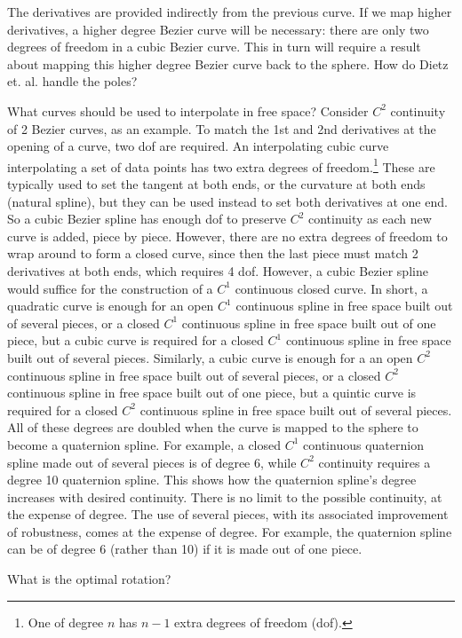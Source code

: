 \documentclass[12pt]{article}
\begin{document}
The derivatives are provided indirectly from the previous curve.
If we map higher derivatives, a higher degree Bezier curve will be necessary:
there are only two degrees of freedom in a cubic Bezier curve.
This in turn will require a result about mapping this higher degree Bezier curve
back to the sphere.
How do Dietz et. al. handle the poles?

What curves should be used to interpolate in free space?
Consider $C^2$ continuity of 2 Bezier curves, as an example.
To match the 1st and 2nd derivatives at the opening of a curve, two dof are required.
An interpolating cubic curve interpolating a set of data points has two extra degrees of freedom.\footnote{One of degree $n$ has $n-1$ extra degrees of freedom (dof).}
These are typically used to set the tangent at both ends, or the curvature at both ends
(natural spline), but they can be used instead to set both derivatives at one end.
So a cubic Bezier spline has enough dof to preserve $C^2$ continuity 
as each new curve is added, piece by piece.
However, there are no extra degrees of freedom to wrap around to form a closed curve,
since then the last piece must match 2 derivatives at both ends,
which requires 4 dof.
However, a cubic Bezier spline would suffice for the construction
of a $C^1$ continuous closed curve.
In short, a quadratic curve is enough for an open $C^1$ continuous spline in free space
built out of several pieces, or a closed $C^1$ continuous spline in free space
built out of one piece, but a cubic curve is required for a closed $C^1$ continuous spline
in free space built out of several pieces.
Similarly, a cubic curve is enough for a an open $C^2$ continuous spline in free space
built out of several pieces, or a closed $C^2$ continuous spline in free space
built out of one piece, but a quintic curve is required for a closed $C^2$ continuous 
spline in free space built out of several pieces.
All of these degrees are doubled when the curve is mapped to the sphere to become
a quaternion spline.
For example, a closed $C^1$ continuous quaternion spline made out of several pieces
is of degree 6, while $C^2$ continuity requires a degree 10 quaternion spline.
This shows how the quaternion spline's degree increases with desired continuity.
There is no limit to the possible continuity, at the expense of degree.
The use of several pieces, with its associated improvement of robustness, comes
at the expense of degree.
For example, the quaternion spline can be of degree 6 (rather than 10) if it
is made out of one piece.

What is the optimal rotation?
\end{document}

